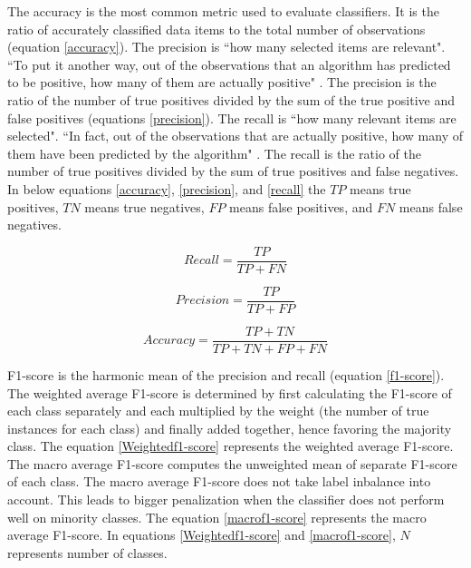 The accuracy is the most common metric used to evaluate classifiers. It is the ratio of accurately classified data items to the total number of observations (equation \ref{accuracy}). The precision is ``how many selected items are relevant". ``To put it another way, out of the observations that an algorithm has predicted to be positive, how many of them are actually positive" \cite{vakili2020performance}. The precision is the ratio of the number of true positives divided by the sum of the true positive and false positives (equations \ref{precision}). The recall is ``how many relevant items are selected". ``In fact, out of the observations that are actually positive, how many of them have been predicted by the algorithm" \cite{vakili2020performance}. The recall is the ratio of the number of true positives divided by the sum of true positives and false negatives. In below equations \ref{accuracy}, \ref{precision}, and \ref{recall} the $TP$ means true positives, $TN$ means true negatives, $FP$ means false positives, and $FN$ means false negatives.



\begin{equation}\label{recall}
\textit{Recall} = \frac{TP}{TP + FN}
\end{equation}

\begin{equation}\label{precision}
\textit{Precision} = \frac{TP}{TP + FP}
\end{equation}


\begin{equation}\label{accuracy}
\textit{Accuracy} = \frac{TP + TN}{TP +TN+ FP + FN}
\end{equation}

F1-score is the harmonic mean of the precision and recall (equation \ref{f1-score}). The weighted average F1-score is determined by first calculating the F1-score of each class separately and each multiplied by the weight (the number of true instances for each class) and finally added together, hence favoring the majority class. The equation \ref{Weightedf1-score} represents the weighted average F1-score. The macro average F1-score computes the unweighted mean of separate F1-score of each class. The macro average F1-score does not take label inbalance into account. This leads to bigger penalization when the classifier does not perform well on minority classes. The equation \ref{macrof1-score} represents the macro average F1-score. In equations \ref{Weightedf1-score} and \ref{macrof1-score}, $N$ represents number of classes.

